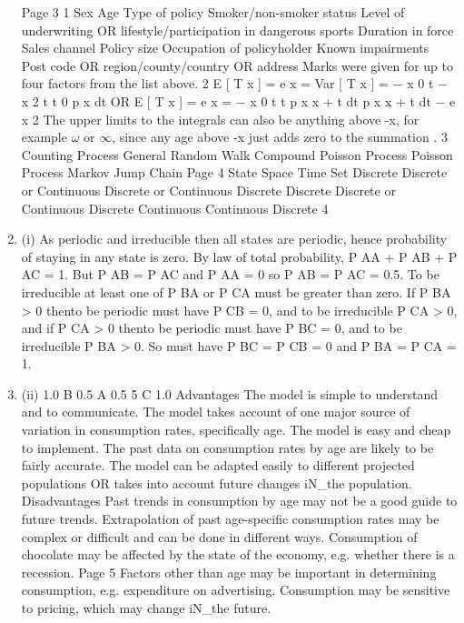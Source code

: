 \documentclass[a4paper,12pt]{article}
\begin{document}
\begin{enumerate}
Page 3 %
1
Sex
Age
Type of policy
Smoker/non-smoker status
Level of underwriting OR lifestyle/participation in dangerous sports
Duration in force
Sales channel
Policy size
Occupation of policyholder
Known impairments
Post code OR region/county/country OR address
Marks were given for up to four factors from the list above.
2
E [ T x ] = e x = \int
Var [ T x ] =
{ \int
\omega− x
0
t
\omega− x 2
t t
0
p x dt
OR
E [ T x ] = e x = \int
\omega− x
0
t t p x \mu x + t dt
}
p x \mu x + t dt − e x 2
The upper limits to the integrals can also be anything above \omega-x, for example $\omega$ or $\infty$, since
any age above \omega-x just adds zero to the summation .
3
Counting Process
General Random Walk
Compound Poisson Process
Poisson Process
Markov Jump Chain
Page 4
State Space Time Set
Discrete
Discrete or Continuous
Discrete or Continuous
Discrete
Discrete Discrete or Continuous
Discrete
Continuous
Continuous
Discrete %
4
\item (i)
As periodic and irreducible then all states are periodic, hence
probability of staying in any state is zero.
By law of total probability, P AA + P AB + P AC = 1.
But P AB = P AC and P AA = 0 so P AB = P AC = 0.5.
To be irreducible at least one of P BA or P CA must be greater than zero.
If P BA > 0 thento be periodic must have P CB = 0,
and to be irreducible P CA > 0,
and if P CA > 0 thento be periodic must have P BC = 0, and to be
irreducible P BA > 0.
So must have P BC = P CB = 0 and P BA = P CA = 1.
\item (ii)
1.0
B
0.5
A
0.5
5
C
1.0
Advantages
The model is simple to understand and to communicate.
The model takes account of one major source of variation in consumption
rates, specifically age.
The model is easy and cheap to implement.
The past data on consumption rates by age are likely to be fairly accurate.
The model can be adapted easily to different projected populations OR takes
into account future changes iN_the population.
Disadvantages
Past trends in consumption by age may not be a good guide to future trends.
Extrapolation of past age-specific consumption rates may be complex or
difficult and can be done in different ways.
Consumption of chocolate may be affected by the state of the economy,
e.g. whether there is a recession.
Page 5 %
Factors other than age may be important in determining consumption,
e.g. expenditure on advertising.
Consumption may be sensitive to pricing, which may change iN_the future.

\end{enumerate}
\end{document}
